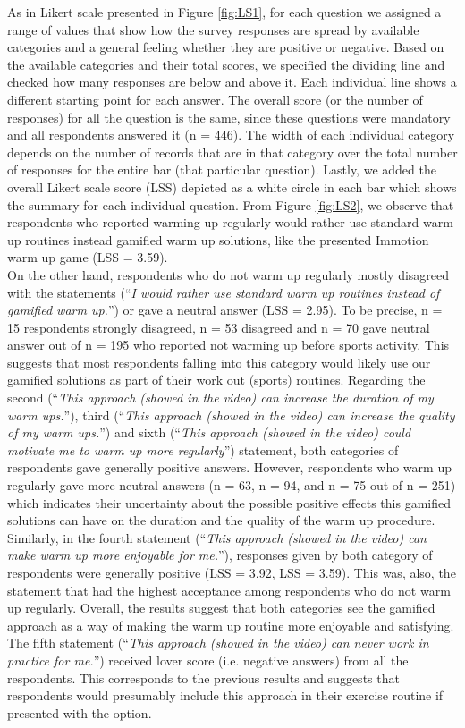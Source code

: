 As in Likert scale presented in Figure \ref{fig:LS1}, for each question we assigned a range of values that show how the survey responses are spread by available categories and a general feeling whether they are positive or negative. Based on the available categories and their total scores, we specified the dividing line and checked how many responses are below and above it. Each individual line shows a different starting point for each answer. The overall score (or the number of responses) for all the question is the same, since these questions were mandatory and all respondents answered it (n = 446). The width of each individual category depends on the number of records that are in that category over the total number of responses for the entire bar (that particular question). Lastly, we added the overall Likert scale score (LSS) depicted as a white circle in each bar which shows the summary for each individual question. From Figure \ref{fig:LS2}, we observe that respondents who reported warming up regularly would rather use standard warm up routines instead gamified warm up solutions, like the presented Immotion warm up game (LSS = 3.59). \\On the other hand, respondents who do not warm up regularly mostly disagreed with the statements (``\textit{I would rather use standard warm up routines instead of gamified warm up.}'') or gave a neutral answer (LSS = 2.95). To be precise, n = 15 respondents strongly disagreed, n = 53 disagreed and n = 70 gave neutral answer out of n = 195 who reported not warming up before sports activity. This suggests that most respondents falling into this category would likely use our gamified solutions as part of their work out (sports) routines. Regarding the second (``\textit{This approach (showed in the video) can increase the duration of my warm ups.}''), third (``\textit{This approach (showed in the video) can increase the quality of my warm ups.}'') and sixth (``\textit{This approach (showed in the video) could motivate me to warm up more regularly}'') statement, both categories of respondents gave generally positive answers. However, respondents who warm up regularly gave more neutral answers (n = 63, n = 94, and n = 75 out of n = 251) which indicates their uncertainty about the possible positive effects this gamified solutions can have on the duration and the quality of the warm up procedure.  Similarly, in the fourth statement (``\textit{This approach (showed in the video) can make warm up more enjoyable for me.}''), responses given by both category of respondents were generally positive (LSS = 3.92, LSS = 3.59). This was, also, the statement that had the highest acceptance among respondents who do not warm up regularly. Overall, the results suggest that both categories see the gamified approach as a way of making the warm up routine more enjoyable and satisfying. The fifth statement (``\textit{This approach (showed in the video) can never work in practice for me.}'') received lover score (i.e. negative answers) from all the respondents. This corresponds to the previous results and suggests that respondents would presumably include this approach in their exercise routine if presented with the option.
